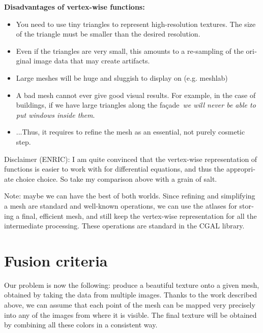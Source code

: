\documentclass{article}
\def\R{\mathbf{R}} %
\begin{document}
\begin{otherlanguage}{british}
{\bf Disadvantages of vertex-wise functions:}

\begin{itemize}
	\item You need to use tiny triangles to represent high-resolution
		textures.  The size of the triangle must be smaller than the
		desired resolution.
	\item Even if the triangles are very small, this amounts to a
		re-sampling of the original image data that may create
		artifacts.
	\item Large meshes will be huge and sluggish to display on (e.g.
		meshlab)
	\item A bad mesh cannot ever give good visual results.  For example,
		in the case of buildings, if we have large triangles along
		the façade~\emph{we will never be able to put windows inside
		them}.
	\item ...Thus, it requires to refine the mesh as an essential, not
		purely cosmetic step.
\end{itemize}

Disclaimer (ENRIC): I am quite convinced that the vertex-wise representation
of functions is easier to work with for differential equations, and thus the
appropriate choice choice.  So take my comparison above with a grain of salt.

Note: maybe we can have the best of both worlds.  Since refining and
simplifying a mesh are standard and well-known operations, we can use the
atlases for storing a final, efficient mesh, and still keep the vertex-wise
representation for all the intermediate processing.  These operations are
standard in the CGAL library.

\end{otherlanguage}



%
%
%








\clearpage
\section{Fusion criteria}

Our problem is now the following: produce a beautiful texture onto a given
mesh, obtained by taking the data from multiple images.  Thanks to the work
described above, we can assume that each point of the mesh can be mapped very
precisely into any of the images from where it is visible.  The final texture
will be obtained by combining all these colors in a consistent way.
\end{document}
